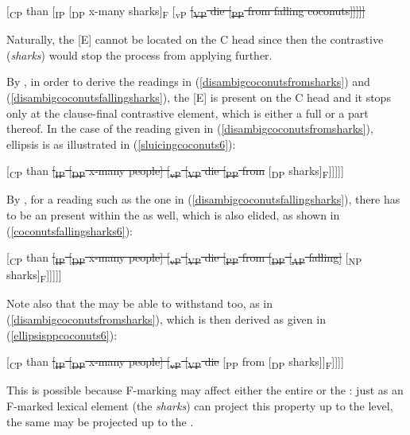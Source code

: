 \ea	{}[\textsubscript{CP} than [\textsubscript{IP} [\textsubscript{DP} x-many sharks]\textsubscript{F} [\textsubscript{vP} \sout{[\textsubscript{VP} die [\textsubscript{PP} from falling coconuts]]]]]} \label{vpellipsiscoconuts6}
\z

Naturally, the [E]  cannot be located on the C head since then the contrastive  (\textit{sharks}) would stop the  process from applying further. 

By , in order to derive the readings in (\ref{disambigcoconutsfromsharks}) and (\ref{disambigcoconutsfallingsharks}), the [E]  is present on the C head and it stops only at the clause-final contrastive element, which is either a full  or a part thereof. In the case of the reading given in (\ref{disambigcoconutsfromsharks}), ellipsis is as illustrated in (\ref{sluicingcoconuts6}):

\ea	{}[\textsubscript{CP} than \sout{[\textsubscript{IP} [\textsubscript{DP} x-many people] [\textsubscript{vP} [\textsubscript{VP} die [\textsubscript{PP} from }[\textsubscript{DP} sharks]\textsubscript{F}]]]]] \label{sluicingcoconuts6}
\z

By , for a reading such as the one in (\ref{disambigcoconutsfallingsharks}), there has to be an  present within the  as well, which is also elided, as shown in (\ref{coconutsfallingsharks6}):

\ea	{}[\textsubscript{CP} than \sout{[\textsubscript{IP} [\textsubscript{DP} x-many people] [\textsubscript{vP} [\textsubscript{VP} die [\textsubscript{PP} from [\textsubscript{DP} [\textsubscript{AP} falling] }[\textsubscript{NP} sharks]\textsubscript{F}]]]]] \label{coconutsfallingsharks6}
\z

Note also that the  may be able to withstand  too, as in (\ref{disambigcoconutsfromsharks}), which is then derived as given in (\ref{ellipsisppcoconuts6}):

\ea	{}[\textsubscript{CP} than \sout{[\textsubscript{IP} [\textsubscript{DP} x-many people] [\textsubscript{vP} [\textsubscript{VP} die }[\textsubscript{PP} from [\textsubscript{DP} sharks]]\textsubscript{F}]]]] \label{ellipsisppcoconuts6}
\z

This is possible because F-marking may affect either the entire  or the : just as an F-marked lexical element (the  \textit{sharks}) can project this property up to the  level, the same may be projected up to the .

